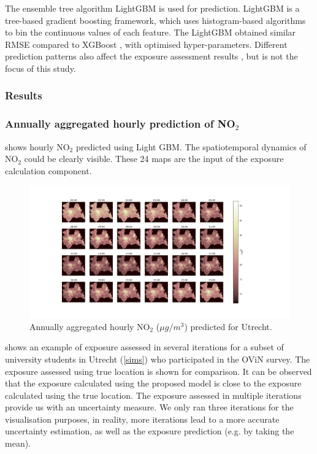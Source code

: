 \documentclass[]{article}
\begin{document}
The ensemble tree algorithm LightGBM \citep{ke2017lightgbm} is used for prediction. LightGBM is a tree-based gradient boosting framework, which uses histogram-based algorithms to bin the continuous values of each feature. The LightGBM obtained similar RMSE compared to XGBoost \citep{chen2015xgboost}, with optimised hyper-parameters. Different prediction patterns also affect the exposure assessment results \citep{yoo2021impact,yoo2015geospatial}, but is not the focus of this study. %
 
\subsubsection{Results}

\subsubsection{Annually aggregated hourly prediction of NO$_2$}

 shows hourly NO$_2$ predicted using Light GBM. The spatiotemporal dynamics of NO$_2$ could be clearly visible. These 24 maps are the input of the exposure calculation component. 

\begin{figure}[h]
    \centering
        \includegraphics[scale = 0.35]{figure/prediUt.png}
    \caption{Annually aggregated hourly NO$_2$ ($\mu g / m^3$) predicted for Utrecht.}
    \label{con}
\end{figure}


 shows an example of exposure assessed in several iterations for a subset of university students in Utrecht (\cref{sims}) who participated in the OViN survey. The exposure assessed using true location is shown for comparison. It can be observed that the exposure calculated using the proposed model is close to the exposure calculated using the true location. The exposure assessed in multiple iterations provide us with an uncertainty measure. We only ran three iterations for the visualisation purposes, in reality, more iterations lead to a more accurate uncertainty estimation, as well as the exposure prediction (e.g. by taking the mean). 
\end{document}
